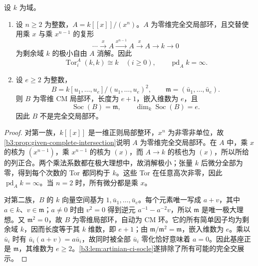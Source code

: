 \begin{proposition}\label{b3:prop:ci-cm-counterexample-families}
	设 \(k\) 为域。
	\begin{enumerate}
		\item 设 \(n\ge2\) 为整数，\(A=k[\![x]\!]/(x^n)\)。\(A\) 为零维完全交局部环，且交替使用乘 \(x\) 与乘 \(x^{n-1}\) 的复形
			\[
				\cdots\xrightarrow{x}A\xrightarrow{x^{n-1}}A \xrightarrow{x}A\longrightarrow k\longrightarrow0
			\]
			为剩余域 \(k\) 的极小自由 \(A\) 消解。因此
			\[
				\operatorname{Tor}_i^A(k,k)\cong k\quad(i\ge0), \qquad\operatorname{pd}_Ak=\infty.
			\]
		\item 设 \(e\ge2\) 为整数，
			\[
				B=k[u_1,\ldots,u_e]/(u_1,\ldots,u_e)^2, \qquad\mathfrak m=(\bar u_1,\ldots,\bar u_e).
			\]
			则 \(B\) 为零维 CM 局部环，长度为 \(e+1\)，嵌入维数为 \(e\)，且
			\[
				\operatorname{Soc}(B)=\mathfrak m, \qquad\dim_k\operatorname{Soc}(B)=e.
			\]
			因此 \(B\) 不是完全交局部环。
	\end{enumerate}
\end{proposition}
\begin{proof}
	对第一族，\(k[\![x]\!]\) 是一维正则局部整环，\(x^n\) 为非零非单位，故\cref{b3:prop:given-complete-intersection}说明 \(A\) 为零维完全交局部环。在 \(A\) 中，乘 \(x\) 的核为 \((x^{n-1})\)，乘 \(x^{n-1}\) 的核为 \((x)\)，而 \(A\to k\) 的核也为 \((x)\)，所以所给的列正合。两个乘法系数都在极大理想中，故消解极小；张量 \(k\) 后微分全部为零，得到每个次数的 Tor 都同构于 \(k\)。这些 Tor 在任意高次非零，因此 \(\operatorname{pd}_Ak=\infty\)。当 \(n=2\) 时，所有微分都是乘 \(x\)。

	对第二族，\(B\) 的 \(k\) 向量空间基为 \(1,\bar u_1,\ldots,\bar u_e\)。每个元素唯一写成 \(a+v\)，其中 \(a\in k\)、\(v\in\mathfrak m\)；\(a\ne0\) 时由 \(v^2=0\) 得到逆元 \(a^{-1}-a^{-2}v\)，所以 \(\mathfrak m\) 是唯一极大理想。又 \(\mathfrak m^2=0\)，故 \(B\) 为零维局部环，自动为 CM 环。它的所有简单因子均为剩余域 \(k\)，因而长度等于其 \(k\) 维数，即 \(e+1\)；由 \(\mathfrak m/\mathfrak m^2=\mathfrak m\)，嵌入维数为 \(e\)。乘以 \(\bar u_i\) 时有 \(\bar u_i(a+v)=a\bar u_i\)，故同时被全部 \(\bar u_i\) 零化恰好意味着 \(a=0\)。因此基座正是 \(\mathfrak m\)，其维数为 \(e\ge2\)。\cref{b3:lem:artinian-ci-socle}遂排除了所有可能的完全交展示。
\end{proof}

